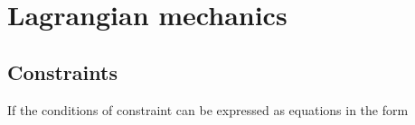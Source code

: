 \documentclass[a4paper,12pt]{report}
\begin{document}
\section{Lagrangian mechanics}
\subsection{Constraints}
If the conditions of constraint can be expressed as equations in the form 
\end{document}

